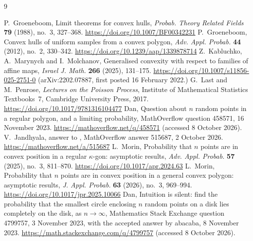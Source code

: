 \documentclass[11pt]{amsart}
\theoremstyle{remark}\newtheorem{remark}[theorem]{Remark}
\begin{document}
\begin{thebibliography}{9}

 P.~Groeneboom, Limit theorems for convex hulls, \emph{Probab. Theory Related Fields}
\textbf{79} (1988), no.~3, 327--368. \url{https://doi.org/10.1007/BF00342231}
 P.~Groeneboom, Convex hulls of uniform samples from a convex polygon, \emph{Adv. Appl.
Probab.} \textbf{44} (2012), no.~2, 330--342. \url{https://doi.org/10.1239/aap/1339878714}
 Z.~Kabluchko, A.~Marynych and I.~Molchanov, Generalised convexity with respect to families of affine
maps, \emph{Israel J. Math.} \textbf{266} (2025), 131--175. \url{https://doi.org/10.1007/s11856-025-2751-0}
(arXiv:2202.07887, first posted 16 February 2022.)
 G.~Last and M.~Penrose, \emph{Lectures on the Poisson Process}, Institute of Mathematical Statistics
Textbooks~7, Cambridge University Press, 2017. \url{https://doi.org/10.1017/9781316104477}
 Dan, Question about $n$ random points in a regular polygon, and a limiting probability, MathOverflow
question 458571, 16 November 2023. \url{https://mathoverflow.net/q/458571} (accessed 8 October 2026).
 V.~Jandhyala, answer to \cite{mo}, MathOverflow answer 515687, 2 October 2026.
\url{https://mathoverflow.net/a/515687}
 L.~Morin, Probability that $n$ points are in convex position in a regular $\kappa$-gon: asymptotic
results, \emph{Adv. Appl. Probab.} \textbf{57} (2025), no.~3, 811--870. \url{https://doi.org/10.1017/apr.2024.63}
 L.~Morin, Probability that $n$ points are in convex position in a general convex polygon:
asymptotic results, \emph{J. Appl. Probab.} \textbf{63} (2026), no.~3, 969--994.\\ \url{https://doi.org/10.1017/jpr.2025.10066}
 Dan, Intuition is silent: find the probability that the smallest circle enclosing $n$ random points on a
disk lies completely on the disk, as $n\to\infty$, Mathematics Stack Exchange question 4799757, 3 November 2023, with
the accepted answer by abacaba, 8 November 2023. \url{https://math.stackexchange.com/q/4799757} (accessed 8 October
2026).
\end{thebibliography}
\end{document}
